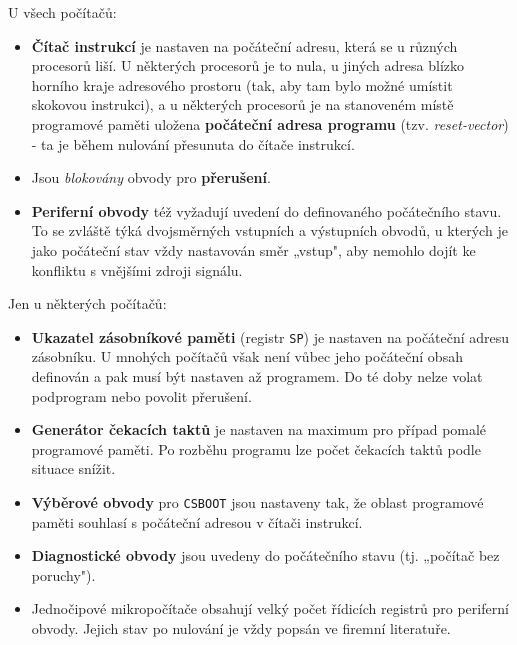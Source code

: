       U všech počítačů:
      \begin{itemize}[noitemsep]
        \item \textbf{Čítač instrukcí} je nastaven na počáteční adresu, která se u různých   
              procesorů liší. U některých procesorů je to nula, u jiných adresa blízko horního 
              kraje adresového prostoru (tak, aby tam bylo možné umístit skokovou instrukci), a u 
              některých procesorů je na stanoveném místě programové paměti uložena 
              \textbf{počáteční adresa programu} (tzv. \emph{reset-vector}) - ta je během nulování 
              přesunuta do čítače instrukcí.
        \item Jsou \emph{blokovány} obvody pro \textbf{přerušení}.
        \item \textbf{Periferní obvody} též vyžadují uvedení do definovaného počátečního stavu. To  
              se zvláště týká dvojsměrných vstupních a výstupních obvodů, u kterých je jako 
              počáteční stav vždy nastavován směr „vstup", aby nemohlo dojít ke konfliktu s 
              vnějšími zdroji signálu.
      \end{itemize}  
          
      Jen u některých počítačů:
      \begin{itemize}[noitemsep]
        \item \textbf{Ukazatel zásobníkové paměti} (registr \texttt{SP}) je nastaven na počáteční  
              adresu zásobníku. U mnohých počítačů však není vůbec jeho počáteční obsah definován a 
              pak musí být nastaven až programem. Do té doby nelze volat podprogram nebo povolit 
              přerušení.
        \item \textbf{Generátor čekacích taktů} je nastaven na maximum pro případ pomalé    
              programové paměti. Po rozběhu programu lze počet čekacích taktů podle situace snížit.
        \item \textbf{Výběrové obvody} pro \texttt{CSBOOT} jsou nastaveny tak, že oblast 
              programové paměti souhlasí s počáteční adresou v čítači instrukcí.
        \item \textbf{Diagnostické obvody} jsou uvedeny do počátečního stavu (tj. „počítač bez  
              poruchy").
        \item Jednočipové mikropočítače obsahují velký počet řídicích registrů pro periferní     
              obvody. Jejich stav po nulování je vždy popsán ve firemní literatuře.
      \end{itemize}
      
